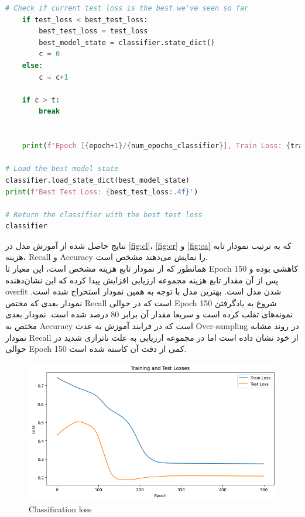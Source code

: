 \documentclass{article}
\begin{document}
\begin{LTR}
\begin{lstlisting}[language=Python, caption=train model]
    # Check if current test loss is the best we've seen so far
    if test_loss < best_test_loss:
        best_test_loss = test_loss
        best_model_state = classifier.state_dict()
        c = 0
    else:
        c = c+1

    if c > t:
        break


    print(f'Epoch [{epoch+1}/{num_epochs_classifier}], Train Loss: {train_losses_classifier[-1]:.4f}, Test Loss: {test_loss:.4f}, Train Recall: {train_recall[-1]:.4f}, Test Recall: {test_recall[-1]:.4f}, Train Accuracy: {train_accuracy[-1]:.4f}, Test Accuracy: {test_accuracy[-1]:.4f}')

# Load the best model state
classifier.load_state_dict(best_model_state)
print(f'Best Test Loss: {best_test_loss:.4f}')

# Return the classifier with the best test loss
classifier
	\end{lstlisting}
\end{LTR}

نتایج حاصل شده از آموزش مدل در 
\autoref{fig:cl}، \autoref{fig:cr} و \autoref{fig:ca} 
که به ترتیب نمودار تابه هزینه، Recall و Accuracy را نمایش می‌دهند مشخص است.‎\\
همانطور که از نمودار تابع هزینه مشخص است، این معیار تا Epoch 150 کاهشی بوده و پس از آن مقدار تابع هزینه مجموعه ارزیابی افزایش پیدا کرده که این نشان‌دهنده overfit شدن مدل است. بهترین مدل با توجه به همین نمودار استخراج شده است. نمودار بعدی که مختص Recall است که در حوالی Epoch 150 شروع به یادگرفتن نمونه‌های تقلب کرده است و سریعا مقدار آن برابر 80 درصد شده است. نمودار بعدی مختص به Accuracy است که در فرایند آموزش به عدت Over-sampling در روند مشابه نمودار Recall از خود نشان داده است اما در مجموعه ارزیابی به علت ناترازی شدید در حوالی Epoch 150 کمی از دقت آن کاسته شده است.
\begin{figure}[H]
\centering
\includegraphics[width=1\linewidth]{img/C_L}
\caption{Classification loss}
\label{fig:cl}
\end{figure}
\end{document}
